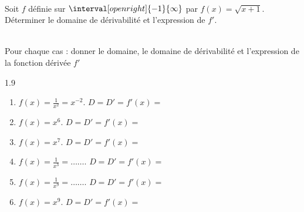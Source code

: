 \documentclass[main.tex]{subfiles}
\begin{document}
\begin{exercise}\hfill \\
Soit $f$ définie sur $\interval[open right]{-1}{\infty}$ par $f(x)=\sqrt{x+1}$. Déterminer le domaine de dérivabilité et l'expression de $f'$.
\end{exercise}
 \begin{exercise}\hfill \\
Pour chaque cas : donner le domaine, le domaine de dérivabilité et l'expression de la fonction dérivée $f'$ 
 	\begin{spacing}{1.9} 
\begin{enumerate}[leftmargin=*,label=\arabic*)]
 		\item $f(x)=\frac{1}{x^2}=x^{-2}$. $D=$\dotfill $D'=$\dotfill $f'(x)=$\dotfill 
 		\item $f(x)=x^6$. $D=$\dotfill $D'=$\dotfill $f'(x)=$\dotfill 
 		\item $f(x)=x^7$. $D=$\dotfill $D'=$\dotfill $f'(x)=$\dotfill
 		\item $f(x)=\frac{1}{x^3}=\ldots\ldots$. $D=$\dotfill $D'=$\dotfill $f'(x)=$\dotfill
 		\item $f(x)=\frac{1}{x^9}=\ldots\ldots$. $D=$\dotfill $D'=$\dotfill $f'(x)=$\dotfill
 		\item $f(x)=x^9$. $D=$\dotfill $D'=$\dotfill $f'(x)=$\dotfill 
	\end{enumerate}
 \end{spacing}
 \end{exercise}\vspace{-1em}
\noindent
\end{document}
